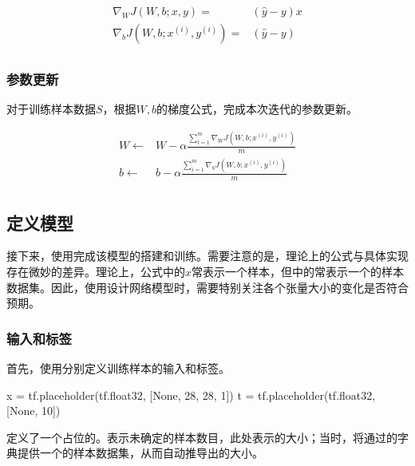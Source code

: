\begin{content}
\[\begin{aligned}
  {\nabla _W}J\left( {W,b;x,y} \right) =  & \left( {\widehat y - y} \right)x \\ 
  {\nabla _b}J\left( {W,b;{x^{(i)}},{y^{(i)}}} \right) =  & \left( {\widehat y - y} \right) \\ 
\end{aligned} \]


\subsubsection{参数更新}

对于训练样本数据$ S $，根据$W, b$的梯度公式，完成本次迭代的参数更新。

\[\begin{aligned}
  W \leftarrow  & W - \alpha \frac{{\sum\limits_{i = 1}^m {{\nabla _W}J\left( {W,b;{x^{(i)}},{y^{(i)}}} \right)} }}{m} \\ 
  b \leftarrow  & b - \alpha \frac{{\sum\limits_{i = 1}^m {{\nabla _b}J\left( {W,b;{x^{(i)}},{y^{(i)}}} \right)} }}{m} \\ 
\end{aligned} \]

\subsection{定义模型}

接下来，使用\tf{}完成该模型的搭建和训练。需要注意的是，理论上的公式与\tf{}具体实现存在微妙的差异。理论上，公式中的$x$常表示一个样本，但\tf{}中的常表示一个的样本数据集。因此，使用\tf{}设计网络模型时，需要特别关注各个张量大小的变化是否符合预期。

\subsubsection{输入和标签}

首先，使用分别定义训练样本的输入和标签。

\begin{leftbar}
\begin{python}
x = tf.placeholder(tf.float32, [None, 28, 28, 1])
t = tf.placeholder(tf.float32, [None, 10])
\end{python}
\end{leftbar}

定义了一个占位的。表示未确定的样本数目，此处表示的大小；当时，将通过的字典提供一个的样本数据集，从而自动推导出的大小。


\end{content}
